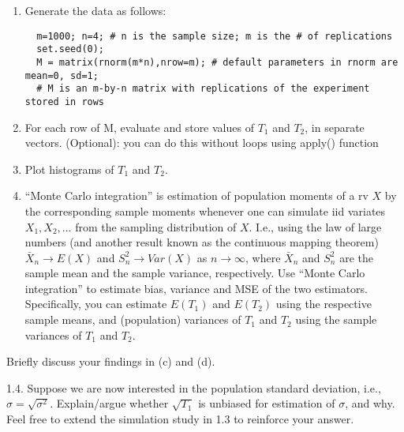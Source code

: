 \documentclass[
  11pt,
]{article}
\begin{document}
\begin{enumerate}
\def\labelenumi{(\alph{enumi})}
\item
  Generate the data as follows:

  \begin{verbatim}
  m=1000; n=4; # n is the sample size; m is the # of replications
  set.seed(0); 
  M = matrix(rnorm(m*n),nrow=m); # default parameters in rnorm are mean=0, sd=1;
  # M is an m-by-n matrix with replications of the experiment stored in rows
  \end{verbatim}
\item
  For each row of M, evaluate and store values of \(T_1\) and \(T_2\),
  in separate vectors. (Optional): you can do this without loops using
  apply() function
\item
  Plot histograms of \(T_1\) and \(T_2\).
\item
  ``Monte Carlo integration'' is estimation of population moments of a
  rv \(X\) by the corresponding sample moments whenever one can simulate
  iid variates \(X_1,X_2,\ldots\) from the sampling distribution of
  \(X\). I.e., using the law of large numbers (and another result known
  as the continuous mapping theorem) \(\bar{X}_n \rightarrow E(X)\) and
  \(S_n^2 \rightarrow Var(X)\) as \(n\rightarrow \infty\), where
  \(\bar{X}_n\) and \(S_n^2\) are the sample mean and the sample
  variance, respectively. Use ``Monte Carlo integration'' to estimate
  bias, variance and MSE of the two estimators. Specifically, you can
  estimate \(E(T_1)\) and \(E(T_2)\) using the respective sample means,
  and (population) variances of \(T_1\) and \(T_2\) using the sample
  variances of \(T_1\) and \(T_2\).
\end{enumerate}

Briefly discuss your findings in (c) and (d).

1.4. Suppose we are now interested in the population standard deviation,
i.e., \(\sigma=\sqrt{\sigma^2}\). Explain/argue whether \(\sqrt{T_1}\)
is unbiased for estimation of \(\sigma\), and why. Feel free to extend
the simulation study in 1.3 to reinforce your answer.
\end{document}
